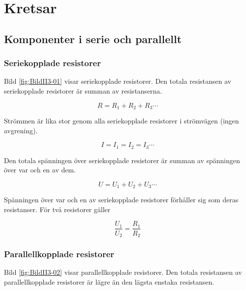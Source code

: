 \chapter{Kretsar}

\section[Serie och parallellt]{Komponenter i serie och parallellt}

\subsection{Seriekopplade resistorer}
\label{seriekopplade_resistorer}


Bild \ref{fig:BildII3-01} visar seriekopplade resistorer.
Den totala resistansen av seriekopplade resistorer är summan av resistanserna.

\[R = R_1 + R_2 + R_3 \cdots \]

Strömmen är lika stor genom alla seriekopplade resistorer i strömvägen (ingen
avgrening).

\[I = I_1 = I_2 = I_3 \cdots \]

Den totala spänningen över seriekopplade resistorer är summan av spänningen över
var och en av dem.

\[U = U_1 + U_2 + U_3 \cdots \]

Spänningen över var och en av seriekopplade resistorer förhåller sig som deras
resistanser. För två resistorer gäller

\[\dfrac{U_1}{U_2} = \dfrac{R_1}{R_2}\]


\subsection{Parallellkopplade resistorer}
\label{parallellkopplade_resistorer}


Bild \ref{fig:BildII3-02} visar parallellkopplade resistorer.
Den totala resistansen av parallellkopplade resistorer är lägre än den lägsta
enstaka resistansen.

